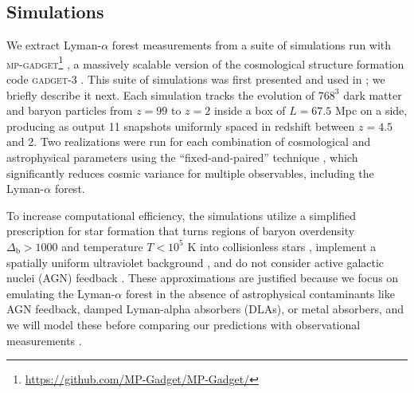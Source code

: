 \documentclass[fleqn,usenatbib]{mnras}
\newcommand{\lyaf}{Lyman-$\alpha$ forest\xspace}
\begin{document}

\subsection{Simulations}
\label{sec:input_sims}

We extract \lyaf measurements from a suite of simulations run with \textsc{mp-gadget}\footnote{\url{https://github.com/MP-Gadget/MP-Gadget/}} \citep{feng2018MpGadgetMpGadgetTag, emugp_bird2019}, a massively scalable version of the cosmological structure formation code \textsc{gadget-3} \citep[last described in][]{Gadget_Springel}. This suite of simulations was first presented and used in \citet{Pedersen2021}; we briefly describe it next. Each simulation tracks the evolution of $768^3$ dark matter and baryon particles from $z=99$ to $z=2$ inside a box of $L = 67.5$ Mpc on a side, producing as output 11 snapshots uniformly spaced in redshift between $z=4.5$ and 2. Two realizations were run for each combination of cosmological and astrophysical parameters using the ``fixed-and-paired'' technique \citep{angulo2016CosmologicalNbodySimulations, pontzen2016InvertedInitialConditions}, which significantly reduces cosmic variance for multiple observables, including the \lyaf \citep{fixedpaired_Villaescusa, anderson2019CosmologicalHydrodynamicSimulations}.

To increase computational efficiency, the simulations utilize a simplified prescription for star formation that turns regions of baryon overdensity $\Delta_\mathrm{b}>1000$ and temperature $T<10^5$ K into collisionless stars \citep[e.g.;][]{viel2004ConstraintsPrimordialPower}, implement a spatially uniform ultraviolet background \citep{haardt2012RadiativeTransferClumpya}, and do not consider active galactic nuclei (AGN) feedback \citep[e.g.;][]{chabanier2020ImpactAGNFeedback}. These approximations are justified because we focus on emulating the \lyaf in the absence of astrophysical contaminants like AGN feedback, damped Lyman-alpha absorbers (DLAs), or metal absorbers, and we will model these before comparing our predictions with observational measurements \citep[e.g.;][]{mcdonald2005LinearTheoryPower, palanque-delabrouille2015ConstraintNeutrinoMasses, palanque-delabrouille2020HintsNeutrinoBounds}.
\end{document}
